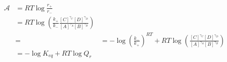 \begin{eqnarray}\label{eqn:reaction-affinity-ratio}
\mathcal A &= RT\log\frac{r_+}{r_-} \\
& = RT\log\left(\frac{k_+}{k_-}\frac{[C]^{\gamma_C}[D]^{\gamma_D}}{[A]^{\gamma_A}[B]^{\gamma_B}}\right) \\
& =
& = -\log\left(\frac{k_-}{k_+}\right)^{RT} + RT\log\left(\frac{[C]^{\gamma_C}[D]^{\gamma_D}}{[A]^{\gamma_A}[B]^{\gamma_B}}\right) \\
& = -\log K_{eq} + RT\log{Q_r} \\
\end{eqnarray}